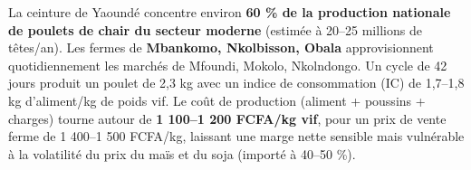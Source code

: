 \documentclass[11pt]{article}
\begin{document}
\begin{exemplebox}
La ceinture de Yaoundé concentre environ \textbf{60 \% de la production nationale de poulets de chair du secteur moderne} (estimée à 20--25 millions de têtes/an). Les fermes de \textbf{Mbankomo, Nkolbisson, Obala} approvisionnent quotidiennement les marchés de Mfoundi, Mokolo, Nkolndongo. Un cycle de 42 jours produit un poulet de 2,3 kg avec un indice de consommation (IC) de 1,7--1,8 kg d'aliment/kg de poids vif. Le coût de production (aliment + poussins + charges) tourne autour de \textbf{1 100--1 200 FCFA/kg vif}, pour un prix de vente ferme de 1 400--1 500 FCFA/kg, laissant une marge nette sensible mais vulnérable à la volatilité du prix du maïs et du soja (importé à 40--50 \%).
\end{exemplebox}
\end{document}
